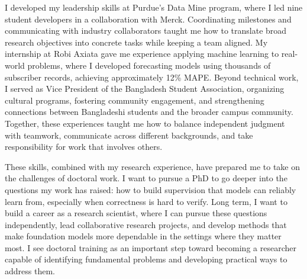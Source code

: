 \documentclass{article}
\begin{document}
I developed my leadership skills at Purdue's Data Mine program, where I led nine student developers in a collaboration with Merck. Coordinating milestones and communicating with industry collaborators taught me how to translate broad research objectives into concrete tasks while keeping a team aligned. My internship at Robi Axiata gave me experience applying machine learning to real-world problems, where I developed forecasting models using thousands of subscriber records, achieving approximately 12\% MAPE. Beyond technical work, I served as Vice President of the Bangladesh Student Association, organizing cultural programs, fostering community engagement, and strengthening connections between Bangladeshi students and the broader campus community. Together, these experiences taught me how to balance independent judgment with teamwork, communicate across different backgrounds, and take responsibility for work that involves others.








These skills, combined with my research experience, have prepared me to take on the challenges of doctoral work. I want to pursue a PhD to go deeper into the questions my work has raised: how to build supervision that models can reliably learn from, especially when correctness is hard to verify. Long term, I want to build a career as a research scientist, where I can pursue these questions independently, lead collaborative research projects, and develop methods that make foundation models more dependable in the settings where they matter most. I see doctoral training as an important step toward becoming a researcher capable of identifying fundamental problems and developing practical ways to address them.
\end{document}
